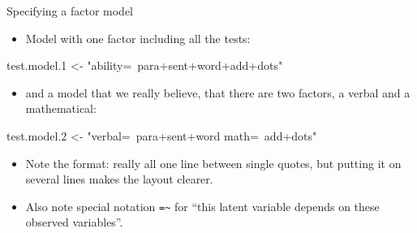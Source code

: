 \documentclass[
  ignorenonframetext,
]{beamer}
\newenvironment{Shaded}{\begin{snugshade}}{\end{snugshade}}
\newcommand{\FloatTok}[1]{\textcolor[rgb]{0.00,0.00,0.81}{#1}}
\newcommand{\NormalTok}[1]{#1}
\newcommand{\StringTok}[1]{\textcolor[rgb]{0.31,0.60,0.02}{#1}}
\providecommand{\tightlist}{%
  \setlength{\itemsep}{0pt}\setlength{\parskip}{0pt}}
\begin{document}
\begin{frame}[fragile]{Specifying a factor model}
\protect\hypertarget{specifying-a-factor-model}{}

\begin{itemize}
\tightlist
\item
  Model with one factor including all the tests:
\end{itemize}

\begin{Shaded}
\begin{Highlighting}[]
\NormalTok{test.model}\FloatTok{.1}\NormalTok{ <-}\StringTok{ "ability=~para+sent+word+add+dots"}
\end{Highlighting}
\end{Shaded}

\begin{itemize}
\tightlist
\item
  and a model that we really believe, that there are two factors, a
  verbal and a mathematical:
\end{itemize}

\begin{Shaded}
\begin{Highlighting}[]
\NormalTok{test.model}\FloatTok{.2}\NormalTok{ <-}\StringTok{ "verbal=~para+sent+word}
\StringTok{                 math=~add+dots"}
\end{Highlighting}
\end{Shaded}

\begin{itemize}
\item
  Note the format: really all one line between single quotes, but
  putting it on several lines makes the layout clearer.
\item
  Also note special notation \texttt{=\textasciitilde{}} for ``this
  latent variable depends on these observed variables''.
\end{itemize}

\end{frame}
\end{document}
